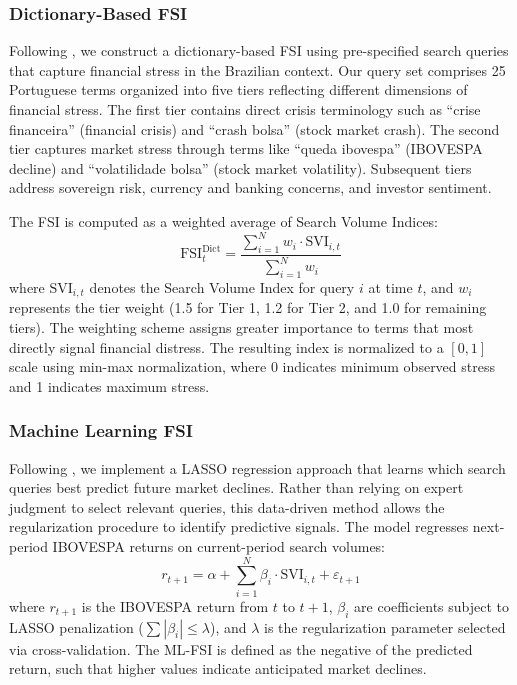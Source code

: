 \subsubsection{Dictionary-Based FSI}

Following \cite{da2011search}, we construct a dictionary-based FSI using pre-specified search queries that capture financial stress in the Brazilian context. Our query set comprises 25 Portuguese terms organized into five tiers reflecting different dimensions of financial stress. The first tier contains direct crisis terminology such as ``crise financeira'' (financial crisis) and ``crash bolsa'' (stock market crash). The second tier captures market stress through terms like ``queda ibovespa'' (IBOVESPA decline) and ``volatilidade bolsa'' (stock market volatility). Subsequent tiers address sovereign risk, currency and banking concerns, and investor sentiment.

The FSI is computed as a weighted average of Search Volume Indices:
\begin{equation}\label{eq:fsi_dict}
    \text{FSI}_t^{\text{Dict}} = \frac{\sum_{i=1}^{N} w_i \cdot \text{SVI}_{i,t}}{\sum_{i=1}^{N} w_i}
\end{equation}
where $\text{SVI}_{i,t}$ denotes the Search Volume Index for query $i$ at time $t$, and $w_i$ represents the tier weight (1.5 for Tier 1, 1.2 for Tier 2, and 1.0 for remaining tiers). The weighting scheme assigns greater importance to terms that most directly signal financial distress. The resulting index is normalized to a $[0, 1]$ scale using min-max normalization, where 0 indicates minimum observed stress and 1 indicates maximum stress.

\subsubsection{Machine Learning FSI}

Following \cite{garcia2023machine}, we implement a LASSO regression approach that learns which search queries best predict future market declines. Rather than relying on expert judgment to select relevant queries, this data-driven method allows the regularization procedure to identify predictive signals. The model regresses next-period IBOVESPA returns on current-period search volumes:
\begin{equation}\label{eq:lasso}
    r_{t+1} = \alpha + \sum_{i=1}^{N} \beta_i \cdot \text{SVI}_{i,t} + \varepsilon_{t+1}
\end{equation}
where $r_{t+1}$ is the IBOVESPA return from $t$ to $t+1$, $\beta_i$ are coefficients subject to LASSO penalization ($\sum|\beta_i| \leq \lambda$), and $\lambda$ is the regularization parameter selected via cross-validation. The ML-FSI is defined as the negative of the predicted return, such that higher values indicate anticipated market declines.

